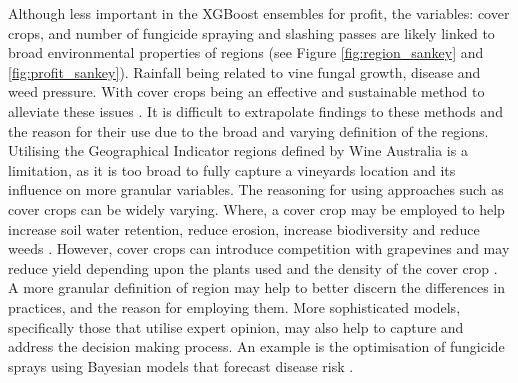 \documentclass[review,12pt,authoryear]{elsarticle}
\begin{document}
\begin{linenumbers}
\par
Although less important in the XGBoost ensembles for profit, the variables: cover crops, and number of fungicide spraying and slashing passes are likely linked to broad environmental properties of regions (see Figure \ref{fig:region_sankey} and \ref{fig:profit_sankey}). Rainfall being related to vine fungal growth, disease and weed pressure. With cover crops being an effective and sustainable method to alleviate these issues \citep{delpuechAdaptingCoverCrop2018}. %
It is difficult to extrapolate findings to these methods and the reason for their use due to the broad and varying definition of the regions. Utilising the Geographical Indicator regions defined by Wine Australia \citep{wineaustraliaWineAustraliaOpenData2021} is a limitation, as it is too broad to fully capture a vineyards location and its influence on more granular variables. The reasoning for using approaches such as cover crops can be widely varying. Where, a cover crop may be employed to help increase soil water retention, reduce erosion, increase biodiversity and reduce weeds \citep{capelloEffectsTractorPasses2019,capelloPermanentCoverSoil2020,delpuechAdaptingCoverCrop2018}. However, cover crops can introduce competition with grapevines and may reduce yield depending upon the plants used and the density of the cover crop \citep{goslingLongtermChangesSoil2005,monteiroInfluenceCoverCrop2007}. A more granular definition of region may help to better discern the differences in practices, and the reason for employing them. More sophisticated models, specifically those that utilise expert opinion, may also help to capture and address the decision making process. An example is the optimisation of fungicide sprays using Bayesian models that forecast disease risk \citep{luDiseaseRiskForecasting2020}. 





\end{linenumbers}
\end{document}
